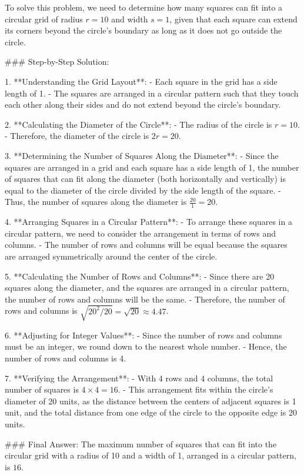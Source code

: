 To solve this problem, we need to determine how many squares can fit into a circular grid of radius \( r = 10 \) and width \( s = 1 \), given that each square can extend its corners beyond the circle's boundary as long as it does not go outside the circle.

### Step-by-Step Solution:

1. **Understanding the Grid Layout**:
   - Each square in the grid has a side length of 1.
   - The squares are arranged in a circular pattern such that they touch each other along their sides and do not extend beyond the circle's boundary.

2. **Calculating the Diameter of the Circle**:
   - The radius of the circle is \( r = 10 \).
   - Therefore, the diameter of the circle is \( 2r = 20 \).

3. **Determining the Number of Squares Along the Diameter**:
   - Since the squares are arranged in a grid and each square has a side length of 1, the number of squares that can fit along the diameter (both horizontally and vertically) is equal to the diameter of the circle divided by the side length of the square.
   - Thus, the number of squares along the diameter is \( \frac{20}{1} = 20 \).

4. **Arranging Squares in a Circular Pattern**:
   - To arrange these squares in a circular pattern, we need to consider the arrangement in terms of rows and columns.
   - The number of rows and columns will be equal because the squares are arranged symmetrically around the center of the circle.

5. **Calculating the Number of Rows and Columns**:
   - Since there are 20 squares along the diameter, and the squares are arranged in a circular pattern, the number of rows and columns will be the same.
   - Therefore, the number of rows and columns is \( \sqrt{20^2 / 20} = \sqrt{20} \approx 4.47 \).

6. **Adjusting for Integer Values**:
   - Since the number of rows and columns must be an integer, we round down to the nearest whole number.
   - Hence, the number of rows and columns is 4.

7. **Verifying the Arrangement**:
   - With 4 rows and 4 columns, the total number of squares is \( 4 \times 4 = 16 \).
   - This arrangement fits within the circle's diameter of 20 units, as the distance between the centers of adjacent squares is 1 unit, and the total distance from one edge of the circle to the opposite edge is 20 units.

### Final Answer:
The maximum number of squares that can fit into the circular grid with a radius of 10 and a width of 1, arranged in a circular pattern, is \(\boxed{16}\).